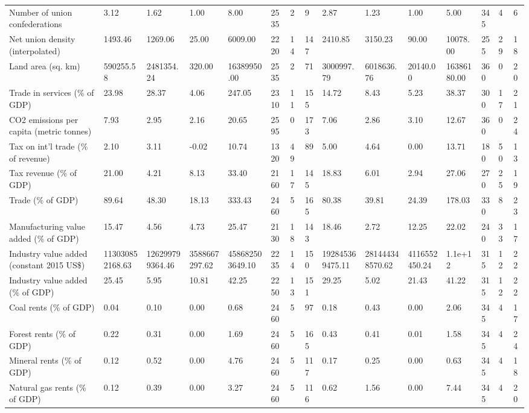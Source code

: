 \begin{longtable}{lllllllllllllll}
Number of union confederations & 3.12 & 1.62 & 1.00 & 8.00 & 2535 & 2 & 9 & 2.87 & 1.23 & 1.00 & 5.00 & 345 & 4 & 6\\
Net union density (interpolated) & 1493.46 & 1269.06 & 25.00 & 6009.00 & 2220 & 14 & 147 & 2410.85 & 3150.23 & 90.00 & 10078.00 & 255 & 29 & 18\\
Land area (sq. km) & 590255.58 & 2481354.24 & 320.00 & 16389950.00 & 2535 & 2 & 71 & 3000997.79 & 6018636.76 & 20140.00 & 16386180.00 & 360 & 0 & 20\\
\addlinespace
Trade in services (\% of GDP) & 23.98 & 28.37 & 4.06 & 247.05 & 2310 & 11 & 155 & 14.72 & 8.43 & 5.23 & 38.37 & 300 & 17 & 21\\
CO2 emissions per capita (metric tonnes) & 7.93 & 2.95 & 2.16 & 20.65 & 2595 & 0 & 173 & 7.06 & 2.86 & 3.10 & 12.67 & 360 & 0 & 24\\
Tax on int'l trade (\% of revenue) & 2.10 & 3.11 & -0.02 & 10.74 & 1320 & 49 & 89 & 5.00 & 4.64 & 0.00 & 13.71 & 180 & 50 & 13\\
Tax revenue (\% of GDP) & 21.00 & 4.21 & 8.13 & 33.40 & 2160 & 17 & 145 & 18.83 & 6.01 & 2.94 & 27.06 & 270 & 25 & 19\\
Trade (\% of GDP) & 89.64 & 48.30 & 18.13 & 333.43 & 2460 & 5 & 165 & 80.38 & 39.81 & 24.39 & 178.03 & 330 & 8 & 23\\
\addlinespace
Manufacturing value added (\% of GDP) & 15.47 & 4.56 & 4.73 & 25.47 & 2130 & 18 & 143 & 18.46 & 2.72 & 12.25 & 22.02 & 240 & 33 & 17\\
Industry value added (constant 2015 US\$) & 113030852168.63 & 126299799364.46 & 3588667297.62 & 458682503649.10 & 2235 & 14 & 150 & 192845369475.11 & 281444348570.62 & 4116552450.24 & 1.1e+12 & 315 & 12 & 22\\
Industry value added (\% of GDP) & 25.45 & 5.95 & 10.81 & 42.25 & 2250 & 13 & 151 & 29.25 & 5.02 & 21.43 & 41.22 & 315 & 12 & 22\\
Coal rents (\% of GDP) & 0.04 & 0.10 & 0.00 & 0.68 & 2460 & 5 & 97 & 0.18 & 0.43 & 0.00 & 2.06 & 345 & 4 & 17\\
Forest rents (\% of GDP) & 0.22 & 0.31 & 0.00 & 1.69 & 2460 & 5 & 165 & 0.43 & 0.41 & 0.01 & 1.58 & 345 & 4 & 24\\
\addlinespace
Mineral rents (\% of GDP) & 0.12 & 0.52 & 0.00 & 4.76 & 2460 & 5 & 117 & 0.17 & 0.25 & 0.00 & 0.63 & 345 & 4 & 18\\
Natural gas rents (\% of GDP) & 0.12 & 0.39 & 0.00 & 3.27 & 2460 & 5 & 116 & 0.62 & 1.56 & 0.00 & 7.44 & 345 & 4 & 20\\

\end{longtable}
